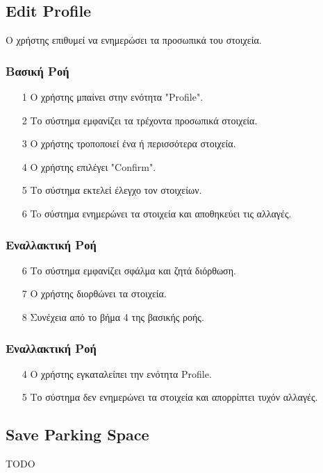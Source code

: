 \documentclass[11pt]{article}
\begin{document}
\subsection{Edit Profile}

Ο χρήστης επιθυμεί να ενημερώσει τα προσωπικά του στοιχεία.

\subsubsection{Βασική Ροή}

\begin{enumerate}
    \item[1] Ο χρήστης μπαίνει στην ενότητα "Profile".
    \item[2] Το σύστημα εμφανίζει τα τρέχοντα προσωπικά στοιχεία.
    \item[3] Ο χρήστης τροποποιεί ένα ή περισσότερα στοιχεία.
    \item[4] Ο χρήστης επιλέγει "Confirm".
    \item[5] Το σύστημα εκτελεί έλεγχο τον στοιχείων.
    \item[6] To σύστημα ενημερώνει τα στοιχεία και αποθηκεύει τις αλλαγές.
\end{enumerate}

\subsubsection{Εναλλακτική Ροή}

\begin{enumerate}
    \item[6] Το σύστημα εμφανίζει σφάλμα και ζητά διόρθωση.
    \item[7] Ο χρήστης διορθώνει τα στοιχεία.
    \item[8] Συνέχεια από το βήμα 4 της βασικής ροής.
\end{enumerate}

\subsubsection{Εναλλακτική Ροή}

\begin{enumerate}
    \item[4] Ο χρήστης εγκαταλείπει την ενότητα Profile.
    \item[5] Το σύστημα δεν ενημερώνει τα στοιχεία και απορρίπτει τυχόν αλλαγές.
\end{enumerate}

\subsection{Save Parking Space}
TODO
\end{document}
